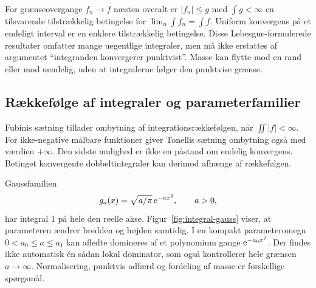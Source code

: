 For grænseovergange $f_n\to f$ næsten overalt er $|f_n|\le g$ med
$\int g<\infty$ en tilsvarende tilstrækkelig betingelse for
$\lim_n\int f_n=\int f$. Uniform konvergens på et endeligt interval er
en enklere tilstrækkelig betingelse. Disse Lebesgue-formulerede resultater
omfatter mange uegentlige integraler, men må ikke erstattes af argumentet
``integranden konvergerer punktvist''. Masse kan flytte mod en rand
eller mod uendelig, uden at integralerne følger den punktvise grænse.

\subsection{Rækkefølge af integraler og parameterfamilier}
Fubinis sætning tillader ombytning af integrationsrækkefølgen, når
$\iint|f|<\infty$. For ikke-negative målbare funktioner giver Tonellis
sætning ombytning også med værdien $+\infty$. Den sidste mulighed er
ikke en påstand om endelig konvergens. Betinget konvergente dobbeltintegraler
kan derimod afhænge af rækkefølgen.

Gaussfamilien
\[
 g_a(x)=\sqrt{a/\pi}\,\mathrm{e}^{-ax^2},\qquad a>0,
\]
har integral 1 på hele den reelle akse. Figur~\ref{fig:integral-gauss}
viser, at parameteren ændrer bredden og højden samtidig. I en kompakt
parameteromegn $0<a_0\le a\le a_1$ kan afledte domineres af et
polynomium gange $\mathrm{e}^{-a_0x^2}$. Der findes ikke automatisk én sådan
lokal dominator, som også kontrollerer hele grænsen $a\to\infty$.
Normalisering, punktvis adfærd og fordeling af masse er forskellige spørgsmål.



